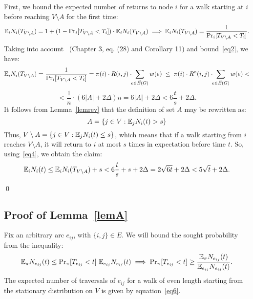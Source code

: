 \documentclass[11pt,a4paper]{article}
\newcommand{\E}{\ensuremath \mathbb E}
\renewcommand{\Pr}{\ensuremath \mathrm {Pr}}
\renewcommand{\*}{\hspace*{5mm}}
\begin{document}
First, we bound the expected number of returns to node $i$ for a walk starting at $i$ before reaching $V\setminus A$ for the first time:
$$
\E_i N_i (T_{V\setminus A}) = 1 + (1-{\Pr_i[T_{V\setminus A}<T_i]})\cdot \E_i N_i (T_{V\setminus A}) \implies \E_i N_i (T_{V\setminus A}) = \frac{1}{\Pr_i[T_{V\setminus A}<T_i]}.
$$
Taking into account~\cite{AF} (Chapter 3, eq. (28) and Corollary 11) and bound~\eqref{eq2}, we have:
$$
\E_i N_i (T_{V\setminus A}) = \frac{1}{\Pr_i[T_{V\setminus A} < T_i]} = \pi(i) \cdot R(i,j)\cdot\!\!\sum_{e \in \vec E(G)} w(e) \;\leq\; \pi(i) \cdot R^\circ(i,j)\cdot\!\!\sum_{e \in \vec E(G)} w(e) <
$$
\begin{equation}
\label{eq4}
< \frac{1}{n}\cdot (6|A|+2\Delta) n = 6|A|+2\Delta < 6 \frac{t}{s} + 2\Delta.
\end{equation}
It follows from Lemma~\ref{lemrev} that the definition of set $A$ may be rewritten as:
$$
A = \{j\in V : \E_j N_i(t) > s\}
$$
Thus, $V\setminus A = \{j\in V : \E_j N_i(t) \leq s\}$, which means that if a walk starting from $i$ reaches $V\setminus A$, it will return to $i$ at most $s$ times in expectation before time $t$. So, using~\eqref{eq4}, we obtain the claim:
$$
\E_i N_i(t) \leq \E_i N_i(T_{V\setminus A}) + s < 6\frac{t}{s} + s + 2\Delta = 2\sqrt{6t} + 2\Delta < 5\sqrt t + 2\Delta.
$$

\qed


\subsection*{Proof of Lemma~\ref{lemA}}

Fix an arbitrary arc $e_{ij}$, with $\{i,j\}\in E$. We will bound the sought probability from the inequality:
\begin{equation}\label{eq5}
\E_{\pi} N_{e_{ij}} (t) \leq \Pr_{\pi} [T_{e_{ij}} < t]\ \E_{e_{ij}} N_{e_{ij}} (t)
\implies
\Pr_{\pi} [T_{e_{ij}} < t] \geq \frac{\E_{\pi} N_{e_{ij}} (t)}{\E_{e_{ij}} N_{e_{ij}} (t)}.
\end{equation}
The expected number of traversals of $e_{ij}$ for a walk of even length starting from the stationary distribution on $V$ is given by equation~\eqref{eq6}.
\end{document}
